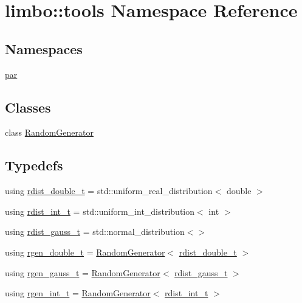 \hypertarget{namespacelimbo_1_1tools}{}\section{limbo\+:\+:tools Namespace Reference}
\label{namespacelimbo_1_1tools}
\subsection*{Namespaces}
\begin{DoxyCompactItemize}
\item 
 \hyperlink{namespacelimbo_1_1tools_1_1par}{par}
\end{DoxyCompactItemize}
\subsection*{Classes}
\begin{DoxyCompactItemize}
\item 
class \hyperlink{classlimbo_1_1tools_1_1_random_generator}{Random\+Generator}
\end{DoxyCompactItemize}
\subsection*{Typedefs}
\begin{DoxyCompactItemize}
\item 
using \hyperlink{group__tools_gab2609bfef1e3bdb8b44c0d6c8c139927}{rdist\+\_\+double\+\_\+t} = std\+::uniform\+\_\+real\+\_\+distribution$<$ double $>$
\item 
using \hyperlink{group__tools_gacb322b4600b2e500dbcd24661a749f49}{rdist\+\_\+int\+\_\+t} = std\+::uniform\+\_\+int\+\_\+distribution$<$ int $>$
\item 
using \hyperlink{group__tools_ga38a794bf956d6bdd1e55f43357826b79}{rdist\+\_\+gauss\+\_\+t} = std\+::normal\+\_\+distribution$<$$>$
\item 
using \hyperlink{group__tools_gacdb2963659056fc5fa9f94405f59a851}{rgen\+\_\+double\+\_\+t} = \hyperlink{classlimbo_1_1tools_1_1_random_generator}{Random\+Generator}$<$ \hyperlink{group__tools_gab2609bfef1e3bdb8b44c0d6c8c139927}{rdist\+\_\+double\+\_\+t} $>$
\item 
using \hyperlink{group__tools_ga8d175579a371b13f2209fc21850c067b}{rgen\+\_\+gauss\+\_\+t} = \hyperlink{classlimbo_1_1tools_1_1_random_generator}{Random\+Generator}$<$ \hyperlink{group__tools_ga38a794bf956d6bdd1e55f43357826b79}{rdist\+\_\+gauss\+\_\+t} $>$
\item 
using \hyperlink{group__tools_ga3df78ebcb864be91e73e840bb42b9208}{rgen\+\_\+int\+\_\+t} = \hyperlink{classlimbo_1_1tools_1_1_random_generator}{Random\+Generator}$<$ \hyperlink{group__tools_gacb322b4600b2e500dbcd24661a749f49}{rdist\+\_\+int\+\_\+t} $>$
\end{DoxyCompactItemize}
